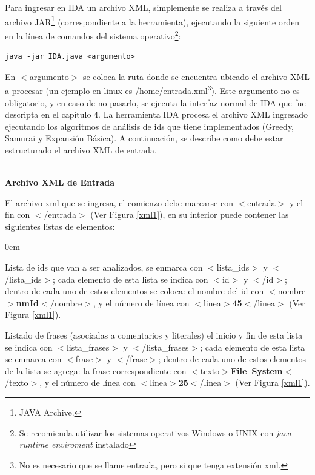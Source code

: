 \begin{appendices}
\newpage

Para ingresar en IDA un archivo XML, simplemente se realiza a través del archivo JAR\footnote[1]{JAVA Archive.} (correspondiente a la herramienta), ejecutando la siguiente orden en la línea de comandos del sistema operativo\footnote[2]{Se recomienda utilizar los sistemas operativos Windows o UNIX con \textit{java runtime enviroment} instalado}:


\begin{lstlisting}[style=BashInputStyle]
  java -jar IDA.java <argumento>
\end{lstlisting}


En $<$\textsf{argumento}$>$ se coloca la ruta donde se encuentra ubicado el archivo XML a procesar (un ejemplo en linux es \textsf{/home/entrada.xml}\footnote[3]{No es necesario que se llame entrada, pero si que tenga extensión xml.}). Este argumento no es obligatorio, y en caso de no pasarlo, se ejecuta la interfaz normal de IDA que fue descripta en el capítulo 4.
La herramienta IDA procesa el archivo XML ingresado ejecutando los algoritmos de análisis de ids que tiene implementados (Greedy, Samurai y Expansión Básica).
A continuación, se describe como debe estar estructurado el archivo XML de entrada.

\noindent \textbf{\\Archivo XML de Entrada\\} 

El archivo xml que se ingresa, el comienzo debe marcarse con \mbox{$<$\textsf{entrada}$>$} y el fin con \mbox{$<$/\textsf{entrada}$>$} (Ver Figura \ref{xml1}), en su interior puede contener las siguientes listas de elementos:

\begin{description}
\itemsep0em%
\item[Lista de Identificadores:] Lista de ids que van a ser analizados, se enmarca con \mbox{$<$\textsf{lista\_ids}$>$} y \mbox{$<$/\textsf{lista\_ids}$>$}; cada elemento de esta lista se indica con $<$\textsf{id}$>$ y $<$/\textsf{id}$>$; dentro de cada uno de estos elementos se coloca: el nombre del id con \mbox{$<$\textsf{nombre}$>$\textbf{nmId}$<$/\textsf{nombre}$>$}, y el número de línea con \mbox{$<$\textsf{linea}$>$\textbf{45}$<$/\textsf{linea}$>$} (Ver Figura \ref{xml1}).

\item[Lista de Frases:] Listado de frases (asociadas a comentarios y literales) el inicio y fin de esta lista se indica con \mbox{$<$\textsf{lista\_frases}$>$} y \mbox{$<$/\textsf{lista\_frases}$>$};
cada elemento de esta lista se enmarca con $<$\textsf{frase}$>$ y $<$/\textsf{frase}$>$; dentro de cada uno de estos elementos de la lista se agrega: la frase correspondiente con \mbox{$<$\textsf{texto}$>$\textbf{File System}$<$/\textsf{texto}$>$}, y el número de línea con \mbox{$<$\textsf{linea}$>$\textbf{25}$<$/\textsf{linea}$>$} (Ver Figura \ref{xml1}).


\end{description}
\end{appendices}
